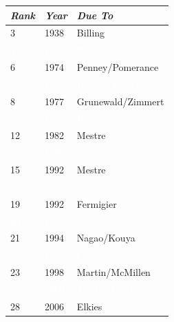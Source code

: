 \begin{frame}
	\begin{table}[h]
	\centering
	\begin{tabular}{lll}  
	{\itshape\large\bfseries Rank} & {\itshape\large\bfseries Year} & {\itshape\large\bfseries Due To} \\ \hline
	3 & 1938 & Billing \\ \rowcolor{UniOrange}
	\textcolor{white}{4} & \textcolor{white}{1945} &  \textcolor{white}{Wiman} \\ 
	6 & 1974 & Penney/Pomerance \\ \rowcolor{UniOrange}
	\textcolor{white}{7} & \textcolor{white}{1975} & \textcolor{white}{Penney/Pomerance} \\
	8 & 1977 & Grunewald/Zimmert \\ \rowcolor{UniOrange}
	\textcolor{white}{9} & \textcolor{white}{1977} & \textcolor{white}{Brumer/Kramer} \\
	12 & 1982 & Mestre \\ \rowcolor{UniOrange}
	\textcolor{white}{14} & \textcolor{white}{1986} & \textcolor{white}{Mestre} \\
	15 & 1992 &  Mestre \\  \rowcolor{UniOrange}
	\textcolor{white}{17} & \textcolor{white}{1992} & \textcolor{white}{Nagao} \\
	19 & 1992 & Fermigier \\ \rowcolor{UniOrange}
	\textcolor{white}{20} & \textcolor{white}{1993} & \textcolor{white}{Nagao} \\
	21 & 1994 & Nagao/Kouya \\ \rowcolor{UniOrange}
	\textcolor{white}{22} & \textcolor{white}{1997} & \textcolor{white}{Fermigier} \\
	23 & 1998 & Martin/McMillen \\ \rowcolor{UniOrange}
	\textcolor{white}{24} & \textcolor{white}{2000} & \textcolor{white}{Martin/McMillen} \\
	28 & 2006 & Elkies 
	\end{tabular}
	\end{table}
\end{frame}




